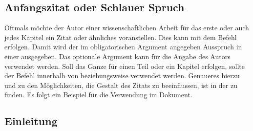 \documentclass[%
  english,ngerman,%
  geometry=no,DIV=12,automark,%
]{tudscrartcl}
\begin{document}
\section{Anfangszitat oder Schlauer Spruch}
\renewcommand*\dictumwidth{.4\textwidth}%
%
\bigskip\noindent
Oftmals möchte der Autor einer wissenschaftlichen Arbeit für das erste oder 
auch jedes Kapitel ein Zitat oder ähnliches voranstellen. Dies kann mit dem 
Befehl  erfolgen. Damit wird 
der im obligatorischen Argument angegeben Ausspruch in einer  
ausgegeben. Das optionale Argument kann für die Angabe des Autors verwendet 
werden. Soll das Ganze für einen Teil oder ein Kapitel erfolgen, sollte der 
Befehl  innerhalb von  beziehungsweise 
 verwendet werden. Genaueres hierzu und zu den 
Möglichkeiten, die Gestalt des Zitats zu beeinflussen, ist in der \scrguide zu 
finden. Es folgt ein Beispiel für die Verwendung im Dokument.
%
\begin{Hint}
\chapter{Einleitung}

\end{Hint}
\end{document}
